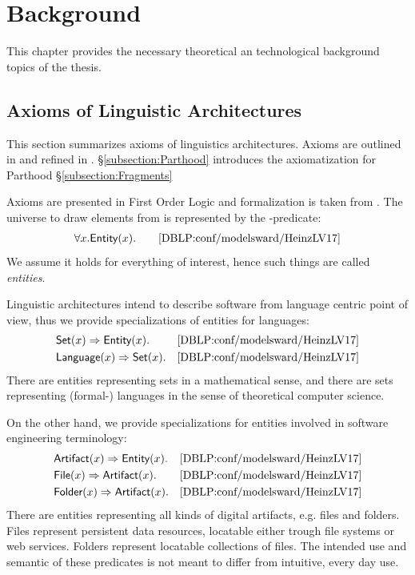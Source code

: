 \chapter{Background}
\label{chapter:Background}
This chapter provides the necessary theoretical an technological background topics of the thesis.

\section{Axioms of Linguistic Architectures}
\label{section:AxiomsOfLinguisticArchitectures}
This section summarizes axioms of linguistics architectures.
Axioms are outlined in \cite{DBLP:conf/sle/Lammel16} and refined in \cite{DBLP:conf/modelsward/HeinzLV17}.
§\ref{subsection:Parthood} introduces the axiomatization for \gls{Parthood}
§\ref{subsection:Fragments} 

Axioms are presented in First Order Logic and formalization is taken from \cite{DBLP:conf/modelsward/HeinzLV17}.
The universe to draw elements from is represented by the \Entity-predicate:
\begin{align*}
\forall x.\textsf{Entity}(x).\qquad\text{\cite{DBLP:conf/modelsward/HeinzLV17}}
\end{align*}
We assume it holds for everything of interest, hence such things are called \textit{entities}.

Linguistic architectures intend to describe software from language centric point of view, thus we provide specializations of entities for languages:
\begin{align*}
&\textsf{Set}(x) \Rightarrow \textsf{Entity}(x).
&\text{\cite{DBLP:conf/modelsward/HeinzLV17}}
\\
&\textsf{Language}(x) \Rightarrow \textsf{Set}(x).
&\text{\cite{DBLP:conf/modelsward/HeinzLV17}}
\end{align*}
There are entities representing sets in a mathematical sense, and there are sets representing (formal-) languages in the sense of theoretical computer science.

On the other hand, we provide specializations for entities involved in software engineering terminology:
\begin{align*}
&\textsf{Artifact}(x) \Rightarrow \textsf{Entity}(x).
&\text{\cite{DBLP:conf/modelsward/HeinzLV17}}
\\
&\textsf{File}(x) \Rightarrow \textsf{Artifact}(x).
&\text{\cite{DBLP:conf/modelsward/HeinzLV17}}
\\
&\textsf{Folder}(x) \Rightarrow \textsf{Artifact}(x).
&\text{\cite{DBLP:conf/modelsward/HeinzLV17}}
\end{align*}
There are entities representing all kinds of digital artifacts, e.g. files and folders.
Files represent persistent data resources, locatable either trough file systems or web services.
Folders represent locatable collections of files.
The intended use and semantic of these predicates is not meant to differ from intuitive, every day use.


